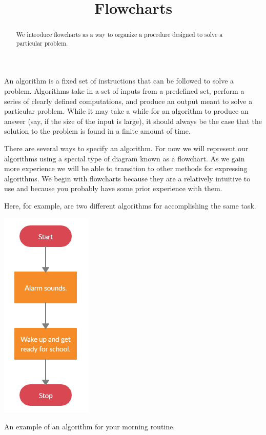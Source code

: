 \documentclass{ximera}
\title{Flowcharts}
\begin{document}
  
\begin{abstract}  
We introduce flowcharts as a way to organize a procedure designed to solve a particular problem.
\end{abstract}  
\maketitle

An algorithm is a fixed set of instructions that can be followed to solve a problem. Algorithms take in a set of inputs from a predefined set, perform a series of clearly defined computations, and produce an output meant to solve a particular problem. While it may take a while for an algorithm to produce an answer (say, if the size of the input is large), it should always be the case that the solution to the problem is found in a finite amount of time.


There are several ways to specify an algorithm. For now we will represent our algorithms using a special type of diagram known as a flowchart. As we gain more experience we will be able to transition to other methods for expressing algorithms. We begin with flowcharts because they are a relatively intuitive to use and because you probably have some prior experience with them.


Here, for example, are two different algorithms for accomplishing the same task. 

\begin{image}
	\includegraphics[scale=0.4]{morning1.png}
\end{image}
\begin{center}
	An example of an algorithm for your morning routine.
\end{center}
\end{document}
